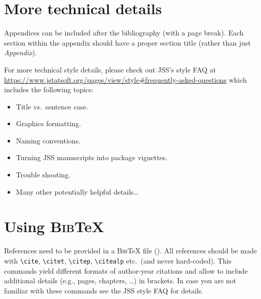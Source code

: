 \documentclass[article]{jss}
\begin{document}
\newpage

\begin{appendix}

\section{More technical details} \label{app:technical}

\begin{leftbar}
Appendices can be included after the bibliography (with a page break). Each
section within the appendix should have a proper section title (rather than
just \emph{Appendix}).

For more technical style details, please check out JSS's style FAQ at
\url{https://www.jstatsoft.org/pages/view/style#frequently-asked-questions}
which includes the following topics:
\begin{itemize}
  \item Title vs.\ sentence case.
  \item Graphics formatting.
  \item Naming conventions.
  \item Turning JSS manuscripts into  package vignettes.
  \item Trouble shooting.
  \item Many other potentially helpful details\dots
\end{itemize}
\end{leftbar}


\section[Using BibTeX]{Using \textsc{Bib}{\TeX}} \label{app:bibtex}

\begin{leftbar}
References need to be provided in a \textsc{Bib}{\TeX} file (). All
references should be made with \verb|\cite|, \verb|\citet|, \verb|\citep|,
\verb|\citealp| etc.\ (and never hard-coded). This commands yield different
formats of author-year citations and allow to include additional details (e.g.,
pages, chapters, \dots) in brackets. In case you are not familiar with these
commands see the JSS style FAQ for details.


\end{leftbar}
\end{appendix}
\end{document}
